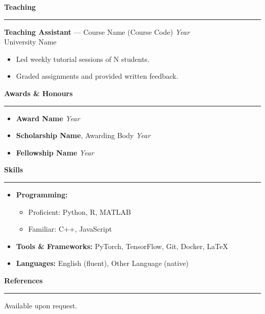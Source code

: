 \documentclass[11pt, a4paper]{article}
\newcommand{\cvsection}[1]{%
  \vspace{10pt}%
  {\large \textbf{#1}}%
  \vspace{3pt}%
  \hrule                        %
  \vspace{6pt}%
}
\begin{document}
\cvsection{Teaching}

\textbf{Teaching Assistant} --- Course Name (Course Code) \hfill \textit{Year} \\{}
University Name

\begin{itemize}
  \setlength{\itemsep}{2pt}
  \item Led weekly tutorial sessions of N students.
  \item Graded assignments and provided written feedback.
\end{itemize}


\cvsection{Awards \& Honours}

\begin{itemize}
  \setlength{\itemsep}{2pt}
  \item \textbf{Award Name} \hfill \textit{Year}
  \item \textbf{Scholarship Name}, Awarding Body \hfill \textit{Year}
  \item \textbf{Fellowship Name} \hfill \textit{Year}
\end{itemize}


\cvsection{Skills}

\begin{itemize}
  \setlength{\itemsep}{3pt}

  \item \textbf{Programming:}
    \begin{itemize}
      \item Proficient: Python, R, MATLAB
      \item Familiar: C++, JavaScript
    \end{itemize}

  \item \textbf{Tools \& Frameworks:} PyTorch, TensorFlow, Git, Docker, \LaTeX

  \item \textbf{Languages:} English (fluent), Other Language (native)

\end{itemize}


\cvsection{References}

Available upon request.

\end{document}

